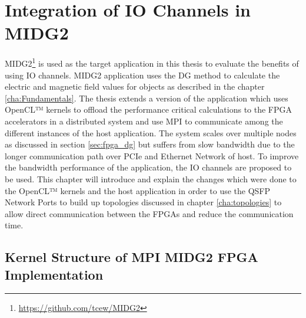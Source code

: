 \chapter{Integration of IO Channels in MIDG2}
\label{cha:sys_arch}

MIDG2\footnote{\url{https://github.com/tcew/MIDG2}} is used as the target
application in this thesis to evaluate the benefits of using IO channels.
MIDG2 application uses the \ac{DG} method to calculate the electric and magnetic
field values for objects as described in the chapter \ref{cha:Fundamentals}.
The thesis extends a version of the application which uses OpenCL™ kernels to
offload the performance critical calculations to the FPGA accelerators in a
distributed system and use MPI to communicate among the different instances of the
host application. The system scales over multiple nodes as discussed in section
\ref{sec:fpga_dg} but suffers from slow bandwidth due to the longer communication
path over PCIe and Ethernet Network of host. To improve the bandwidth performance
of the application, the IO channels are proposed to be used. This chapter will
introduce and explain the changes which were done to the OpenCL™ kernels and the
host application in order to use the QSFP Network Ports to build up topologies discussed
in chapter \ref{cha:topologies} to allow direct communication between the FPGAs
and reduce the communication time.

\section{Kernel Structure of MPI MIDG2 FPGA Implementation}
\label{sec:midge_mpi}


